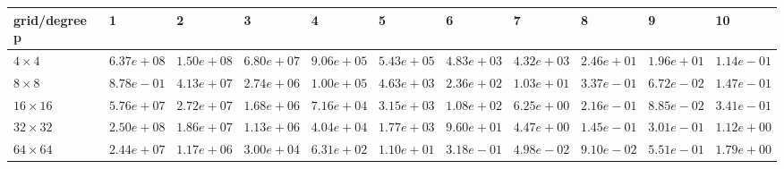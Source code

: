 \begin{tabular}{lllllllllll}
\hline
 grid/degree p   & 1          & 2          & 3          & 4          & 5          & 6          & 7          & 8          & 9          & 10         \\
\hline
 $4 \times 4$    & $6.37e+08$ & $1.50e+08$ & $6.80e+07$ & $9.06e+05$ & $5.43e+05$ & $4.83e+03$ & $4.32e+03$ & $2.46e+01$ & $1.96e+01$ & $1.14e-01$ \\
 $8 \times 8$    & $8.78e-01$ & $4.13e+07$ & $2.74e+06$ & $1.00e+05$ & $4.63e+03$ & $2.36e+02$ & $1.03e+01$ & $3.37e-01$ & $6.72e-02$ & $1.47e-01$ \\
 $16 \times 16$  & $5.76e+07$ & $2.72e+07$ & $1.68e+06$ & $7.16e+04$ & $3.15e+03$ & $1.08e+02$ & $6.25e+00$ & $2.16e-01$ & $8.85e-02$ & $3.41e-01$ \\
 $32 \times 32$  & $2.50e+08$ & $1.86e+07$ & $1.13e+06$ & $4.04e+04$ & $1.77e+03$ & $9.60e+01$ & $4.47e+00$ & $1.45e-01$ & $3.01e-01$ & $1.12e+00$ \\
 $64 \times 64$  & $2.44e+07$ & $1.17e+06$ & $3.00e+04$ & $6.31e+02$ & $1.10e+01$ & $3.18e-01$ & $4.98e-02$ & $9.10e-02$ & $5.51e-01$ & $1.79e+00$ \\
\hline
\end{tabular}
